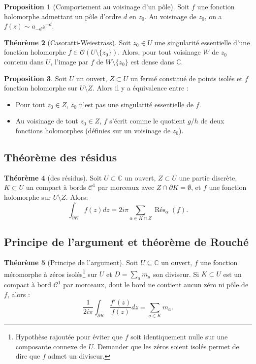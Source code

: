 \documentclass[11pt,a4paper]{article}
\newcommand{\C}{\mathbb{C}}
\theoremstyle{definition}
\newtheorem{theoreme}{Th\'eor\`eme}[section]
\newtheorem{proposition}[theoreme]{Proposition}
\theoremstyle{plain}
\begin{document}
\begin{proposition}[Comportement au voisinage d'un pôle]
Soit $f$ une fonction holomorphe admettant un pôle d'ordre $d$ en $z_0$.
Au voisinage de $z_0$, on a $f(z) \sim a_{-d}z^{-d}$.
\end{proposition}

\begin{theoreme}[Casoratti-Weiestrass]
Soit $z_0 \in U$ une singularité essentielle d'une fonction holomorphe $f \in \mathcal O(U\setminus \{z_0\})$.
Alors, pour tout voisinage $W$ de $z_0$ contenu dans $U$, l'image par $f$ de $W\setminus\{z_0\}$ est dense dans $\C$.
\end{theoreme}


\begin{proposition}
Soit $U$ un ouvert,  $Z\subset U$ un fermé constitué de points isolés et $f$ fonction holomorphe sur $U\setminus Z$.
Alors il y a équivalence entre :
\begin{itemize}
\item Pour tout $z_0\in Z$, $z_0$ n'est pas une singularité essentielle de $f$.
\item Au voisinage de tout $z_0\in Z$, $f$ s'écrit comme le quotient $g/h$ de deux fonctions holomorphes (définies sur un voisinage de $z_0$).
\end{itemize}
\end{proposition}


\subsection{Théorème des résidus}


\begin{theoreme}[des résidus]
Soit $U\subset \C$ un ouvert, $Z\subset U$ une partie discrète, $K\subset U$ un compact à bords $\mathcal C^1$ par morceaux avec $Z\cap \partial K = \emptyset$, et $f$ une fonction holomorphe sur $U\setminus Z$.
Alors:
\[ \int_{\partial K} f(z)dz = 2i\pi \sum_{\alpha \in K\cap Z} \operatorname{Rés}_\alpha(f).\]
\end{theoreme}



\subsection{Principe de l'argument et théorème de Rouché}



\begin{theoreme}[Principe de l'argument]
Soit $U\subseteq \C$ un ouvert, $f$ une fonction méromorphe à zéros isolés\footnote{Hypothèse rajoutée pour éviter que $f$ soit identiquement nulle sur une composante connexe de $U$. Demander que les zéros soient isolés permet de dire que $f$ admet un diviseur.} sur $U$ et $D = \sum_a m_a$ son diviseur.
Si $K\subset U$ est un compact à bord $\mathcal C^1$ par morceaux, dont le bord ne contient aucun zéro ni pôle de $f$, alors :
\[ \frac{1}{2i\pi} \int_{\partial K} \frac{f'(z)}{f(z)}dz = \sum_{a \in K} m_a.\]
\end{theoreme}
\end{document}

